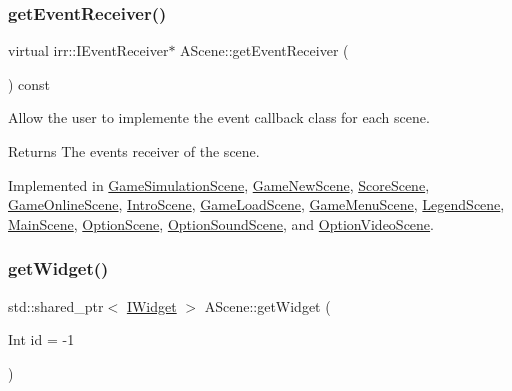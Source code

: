 \subsubsection{\texorpdfstring{get\+Event\+Receiver()}{getEventReceiver()}}
{\footnotesize\ttfamily virtual irr\+::\+I\+Event\+Receiver$\ast$ A\+Scene\+::get\+Event\+Receiver (\begin{DoxyParamCaption}{ }\end{DoxyParamCaption}) const\hspace{0.3cm}{\ttfamily [pure virtual]}}



Allow the user to implemente the event callback class for each scene. 

\begin{DoxyReturn}{Returns}
The events\textquotesingle{} receiver of the scene. 
\end{DoxyReturn}


Implemented in \hyperlink{classGameSimulationScene_a048b2a937caff3af7b4d54f8bd404ec1}{Game\+Simulation\+Scene}, \hyperlink{classGameNewScene_a21c27ef3ea1923d975683e1bcdd134fa}{Game\+New\+Scene}, \hyperlink{classScoreScene_ae398ba58a33b3605a0c71265202534e2}{Score\+Scene}, \hyperlink{classGameOnlineScene_a00ce9773db4f1886fc463b023cbf63f9}{Game\+Online\+Scene}, \hyperlink{classIntroScene_acabf925dab7b2a346edd398445cd5800}{Intro\+Scene}, \hyperlink{classGameLoadScene_a81807790ad65bd2cf97a1e543cae2b74}{Game\+Load\+Scene}, \hyperlink{classGameMenuScene_adcb01430b24486c4e5d0157fc32d7611}{Game\+Menu\+Scene}, \hyperlink{classLegendScene_ab11340ae844c04d704f28e1ef188deae}{Legend\+Scene}, \hyperlink{classMainScene_af9fbc6337aa6ff42447c702e91e77237}{Main\+Scene}, \hyperlink{classOptionScene_a8848b9040ee7fd9c1d05a22181c5e053}{Option\+Scene}, \hyperlink{classOptionSoundScene_ac71da65763f0db4b05fc32444308b677}{Option\+Sound\+Scene}, and \hyperlink{classOptionVideoScene_a84625e871c5176d7abc77a7f12c1472a}{Option\+Video\+Scene}.

\mbox{\label{classAScene_a04796ae4f8cfdf49f7e3295c29fc97cc}} 
\subsubsection{\texorpdfstring{get\+Widget()}{getWidget()}}
{\footnotesize\ttfamily std\+::shared\+\_\+ptr$<$ \hyperlink{classIWidget}{I\+Widget} $>$ A\+Scene\+::get\+Widget (\begin{DoxyParamCaption}\item[{Int}]{id = {\ttfamily -\/1} }\end{DoxyParamCaption})}



